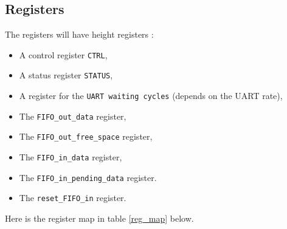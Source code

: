 \documentclass[11pt]{article}
\begin{document}
\subsection{Registers}
The registers will have height registers :
\begin{itemize}
    \item A control register \texttt{CTRL},
    \item A status register \texttt{STATUS},
    \item A register for the \texttt{UART waiting cycles} (depends on the UART rate),
    \item The \texttt{FIFO\_out\_data} register,
    \item The \texttt{FIFO\_out\_free\_space} register,
    \item The \texttt{FIFO\_in\_data} register,
    \item The \texttt{FIFO\_in\_pending\_data} register.
    \item The \texttt{reset\_FIFO\_in} register.
\end{itemize}
Here is the register map in table \ref{reg_map} below.
\end{document}
